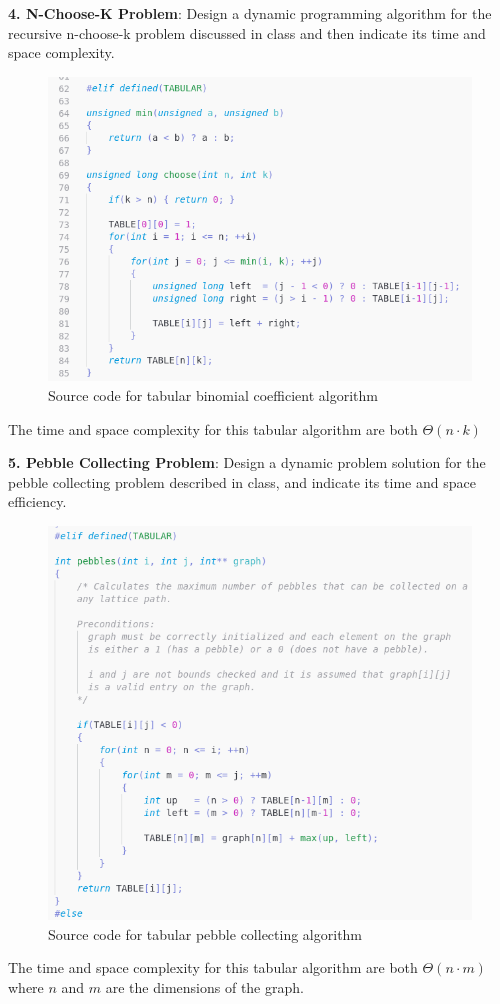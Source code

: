 \documentclass[11pt,letterpaper]{report}
\begin{document}
{  \pagebreak

  \noindent\textbf{4. N-Choose-K Problem}: Design a dynamic programming algorithm for the
  recursive n-choose-k problem discussed in class and then indicate its time and space 
  complexity.

  \begin{figure}[h!]
	\centering
	\includegraphics[width=1\linewidth]{choose1.png}
	\caption[cs350]{Source code for tabular binomial coefficient algorithm}
	\label{fig:P1compileP0-1}
  \end{figure}

  The time and space complexity for this tabular algorithm are both $\Theta(n\cdot k)$

  \pagebreak

  \noindent\textbf{5. Pebble Collecting Problem}: Design a dynamic problem solution 
  for the pebble collecting problem described in class, and indicate its time 
  and space efficiency. 

  \begin{figure}[h!]
	\centering
	\includegraphics[width=1\linewidth]{pebbles1.png}
	\caption[cs350]{Source code for tabular pebble collecting algorithm}
	\label{fig:P1compileP0-1}
  \end{figure}

  The time and space complexity for this tabular algorithm are both $\Theta(n \cdot m)$
  where $n$ and $m$ are the dimensions of the graph. 

\ifdefined \LF
} %
\fi
\end{document}
